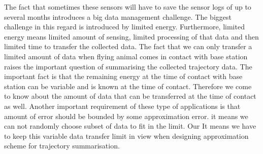 \documentclass[conference]{IEEEtran}
\begin{document}
The fact that sometimes these sensors will have to save the sensor logs of up to several months introduces a big data management challenge. The biggest challenge in this regard is introduced by limited energy. Furthermore, limited energy means limited amount of sensing, limited processing of that data and then limited time to transfer the collected data. The fact that we can only transfer a limited amount of data when flying animal comes in contact with base station raises the important question of summarising the collected trajectory data. The important fact is that the remaining energy at the time of contact with base station can be variable and is known at the time of contact. Therefore we come to know about the amount of data that can be transferred at the time of contact as well. Another important requirement of these type of applications is that amount of error should be bounded by some approximation error. it means we can not randomly choose subset of data to fit in the limit. Our It means we have to keep this variable data transfer limit in view when designing approximation scheme for trajectory summarisation.


\end{document}
